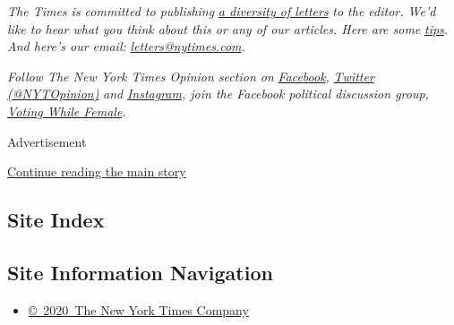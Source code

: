 \emph{The Times is committed to publishing}
\href{https://www.nytimes.com/2019/01/31/opinion/letters/letters-to-editor-new-york-times-women.html}{\emph{a
diversity of letters}} \emph{to the editor. We'd like to hear what you
think about this or any of our articles. Here are some}
\href{https://help.nytimes.com/hc/en-us/articles/115014925288-How-to-submit-a-letter-to-the-editor}{\emph{tips}}\emph{.
And here's our email:}
\href{mailto:letters@nytimes.com}{\emph{letters@nytimes.com}}\emph{.}

\emph{Follow The New York Times Opinion section on}
\href{https://www.facebook.com/nytopinion}{\emph{Facebook}}\emph{,}
\href{http://twitter.com/NYTOpinion}{\emph{Twitter (@NYTOpinion)}}
\emph{and}
\href{https://www.instagram.com/nytopinion/}{\emph{Instagram}}\emph{,
join the Facebook political discussion group,}
\href{https://www.facebook.com/groups/votingwhilefemale/}{\emph{Voting
While Female}}\emph{.}

Advertisement

\protect\hyperlink{after-bottom}{Continue reading the main story}

\hypertarget{site-index}{%
\subsection{Site Index}\label{site-index}}

\hypertarget{site-information-navigation}{%
\subsection{Site Information
Navigation}\label{site-information-navigation}}

\begin{itemize}
\tightlist
\item
  \href{https://help.nytimes.com/hc/en-us/articles/115014792127-Copyright-notice}{©~2020~The
  New York Times Company}
\end{itemize}

